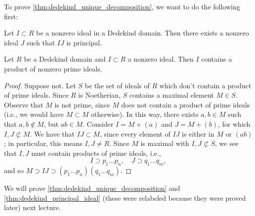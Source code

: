 To prove \ref{thm:dedekind_unique_decomposition}, we want to do the following first:

\begin{theorem*}
    Let $I \subset R$ be a nonzero ideal in a Dedekind domain. Then there exists a nonzero ideal $J$ such that $IJ$ is principal.
\end{theorem*}

\begin{lemma} \label{lem:dedekind_nonzero_ideal_contains_product_of_prime_ideals}
    Let $R$ be a Dedekind domain and $I \subset R$ a nonzero ideal. Then $I$ contains a product of nonzero prime ideals.
\end{lemma}
\begin{proof}
    Suppose not. Let $S$ be the set of ideals of $R$ which don't contain a product of prime ideals. Since $R$ is Noetherian, $S$ contains a maximal element $M \in S$. Observe that $M$ is not prime, since $M$ does not contain a product of prime ideals (i.e., we would have $M \subset M$ otherwise). In this way, there exists $a, b \in M$ such that $a, b \notin M$, but $ab \in M$. Consider $I = M + (a)$ and $J = M + (b)$, for which $I, J \not\subset M$. We have that $IJ \subset M$, since every element of $IJ$ is either in $M$ or $(ab)$; in particular, this means $I, J \neq R$. Since $M$ is maximal with $I, J \not\subset S$, we see that $I, J$ must contain products of prime ideals, i.e.,
    \[ I \supset p_1 \dots p_n, \quad J \supset q_1 \dots q_m, \]
    and so $M \supset IJ \supset (p_1 \dots p_n)(q_1 \dots q_m)$.
\end{proof}

We will prove \ref{thm:dedekind_unique_decomposition} and \ref{thm:dedekind_principal_ideal} {\color{amethyst}(these were relabeled because they were proved later)} next lecture.